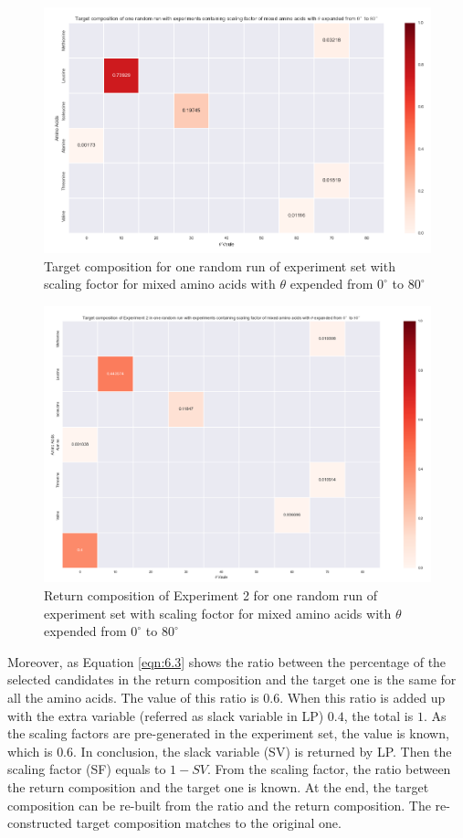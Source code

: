 \begin{figure}[!ht] 
\centering
\includegraphics[scale=0.5]{Figures/chapter6_figure_one.png}
\caption{Target composition for one random run of experiment set with scaling foctor for mixed amino acids with $\theta$ expended from $0^{\circ}$ to $80^{\circ}$} \label{fig:6.1}
\end{figure}


\begin{figure}[!ht] 
\centering
\includegraphics[scale=0.4]{Figures/chapter6_figure_two.png}
\caption{Return composition of Experiment 2 for one random run of experiment set with scaling foctor for mixed amino acids with $\theta$ expended from $0^{\circ}$ to $80^{\circ}$} \label{fig:6.2}
\end{figure}

Moreover, as Equation \ref{eqn:6.3} shows the ratio between the percentage of the selected candidates in the return composition and the target one is the same for all the amino acids. The value of this ratio is $0.6$. When this ratio is added up with the extra variable (referred as slack variable in LP) $0.4$, the total is $1$. As the scaling factors are pre-generated in the experiment set, the value is known, which is $0.6$. In conclusion, the slack variable (SV) is returned by LP. Then the scaling factor (SF) equals to $1 - SV$. From the scaling factor, the ratio between the return composition and the target one is known. At the end, the target composition can be re-built from the ratio and the return composition. The re-constructed target composition matches to the original one. \\

